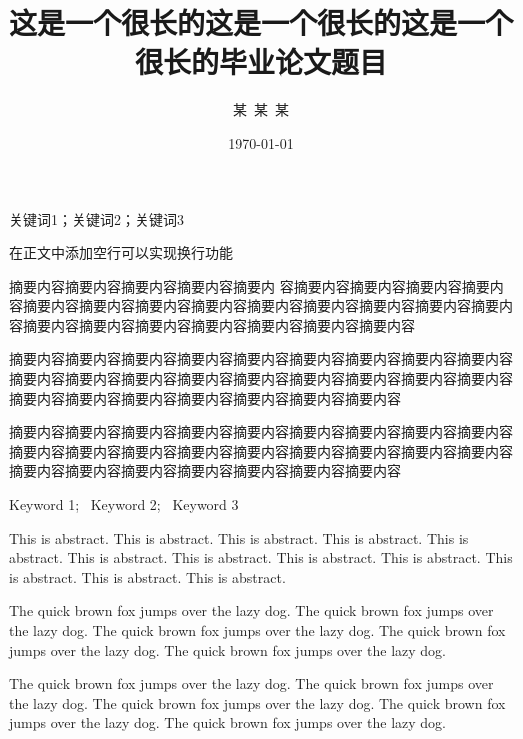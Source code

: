 \documentclass{shnuthesis}
\title{这是一个很长的这是一个很长的这是一个很长的毕业论文题目}
\author{某~某~某} %
\date{\today} %
\begin{document}
\maketitle


\clearpage   %

\begin{cnabstract}{关键词1；关键词2；关键词3}

在正文中添加空行可以实现换行功能
		
摘要内容摘要内容摘要内容摘要内容摘要内 容摘要内容摘要内容摘要内容摘要内容摘要内容摘要内容摘要内容摘要内容摘要内容摘要内容摘要内容摘要内容摘要内容摘要内容摘要内容摘要内容摘要内容摘要内容摘要内容摘要内容
		
摘要内容摘要内容摘要内容摘要内容摘要内容摘要内容摘要内容摘要内容摘要内容摘要内容摘要内容摘要内容摘要内容摘要内容摘要内容摘要内容摘要内容摘要内容摘要内容摘要内容摘要内容摘要内容摘要内容摘要内容摘要内容

摘要内容摘要内容摘要内容摘要内容摘要内容摘要内容摘要内容摘要内容摘要内容摘要内容摘要内容摘要内容摘要内容摘要内容摘要内容摘要内容摘要内容摘要内容摘要内容摘要内容摘要内容摘要内容摘要内容摘要内容摘要内容

\end{cnabstract}



\begin{enabstract}{Keyword 1;~ Keyword 2;~ Keyword 3}


This is abstract. This is abstract. This is abstract. This is abstract. This is abstract. This is abstract. This is abstract. This is abstract. This is abstract. This is abstract. This is abstract. This is abstract.
		
The quick brown fox jumps over the lazy dog. The quick brown fox jumps over the lazy dog. The quick brown fox jumps over the lazy dog. The quick brown fox jumps over the lazy dog. The quick brown fox jumps over the lazy dog.

The quick brown fox jumps over the lazy dog. The quick brown fox jumps over the lazy dog. The quick brown fox jumps over the lazy dog. The quick brown fox jumps over the lazy dog. The quick brown fox jumps over the lazy dog.

\end{enabstract}
	
\end{document}
